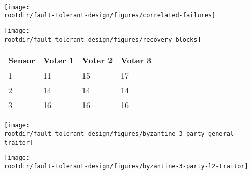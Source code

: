 \documentclass[11pt]{article}
\def\rootdir{../}
\begin{document}
\vfill

\begin{center}

\end{center}

\vfill
\begin{figure}[!h]
\centering
{}
~~~
\end{figure}

\vfill

\pagebreak

\begin{center}
 \texttt{[image: \\rootdir/fault-tolerant-design/figures/correlated-failures]}
\end{center}

\vfill

\begin{center}
 \texttt{[image: \\rootdir/fault-tolerant-design/figures/recovery-blocks]}
\end{center}

\vfill 

\pagebreak

\begin{center}
\begin{tabular}{llll}
\hline
 {\bf Sensor} & {\bf Voter 1} & {\bf Voter 2} & {\bf Voter 3}\\
\hline
 1 & 11 & 15 & 17\\
 2 & 14 & 14 & 14\\
 3 & 16 & 16 & 16\\
\hline
\end{tabular}
\end{center}

\pagebreak

\begin{center}
  \texttt{[image: \\rootdir/fault-tolerant-design/figures/byzantine-3-party-general-traitor]}
\end{center}

\vfill

\begin{center}
  \texttt{[image: \\rootdir/fault-tolerant-design/figures/byzantine-3-party-l2-traitor]}
\end{center}

\vfill
\end{document}
